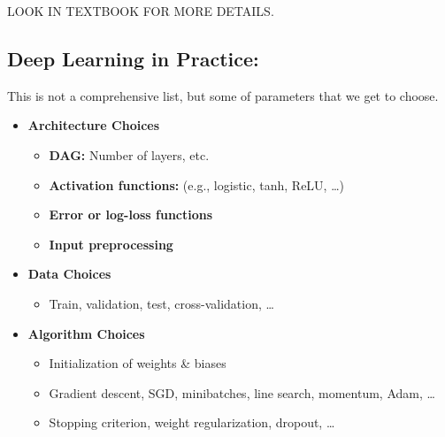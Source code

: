 LOOK IN TEXTBOOK FOR MORE DETAILS. 
\subsection{Deep Learning in Practice:}
\begin{summary}
    This is not a comprehensive list, but some of parameters that we get to choose. 
    \begin{itemize}
        \item \textbf{Architecture Choices}
        \begin{itemize}
            \item \textbf{DAG:} Number of layers, etc.
            \item \textbf{Activation functions:} (e.g., logistic, tanh, ReLU, \dots)
            \item \textbf{Error or log-loss functions}
            \item \textbf{Input preprocessing}
        \end{itemize}
    
        \item \textbf{Data Choices}
        \begin{itemize}
            \item Train, validation, test, cross-validation, \dots
        \end{itemize}
    
        \item \textbf{Algorithm Choices}
        \begin{itemize}
            \item Initialization of weights \& biases
            \item Gradient descent, SGD, minibatches, line search, momentum, Adam, \dots
            \item Stopping criterion, weight regularization, dropout, \dots
        \end{itemize}
    \end{itemize}
\end{summary}

